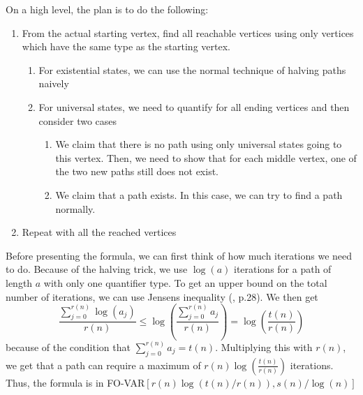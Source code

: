 On a high level, the plan is to do the following:
\begin{enumerate}
    \setlength\itemsep{0.2em}
    \item From the actual starting vertex, find all reachable vertices using only vertices which have the same type as the starting vertex.
    \begin{enumerate}
        \item For existential states, we can use the normal technique of halving paths naively
        \item For universal states, we need to quantify for all ending vertices and then consider two cases
        \begin{enumerate}
            \item We claim that there is no path using only universal states going to this vertex.
            Then, we need to show that for each middle vertex, one of the two new paths still does not exist.
            \item We claim that a path exists.
            In this case, we can try to find a path normally.
        \end{enumerate}
    \end{enumerate}
    \item Repeat with all the reached vertices
\end{enumerate}

Before presenting the formula, we can first think of how much iterations we need to do.
Because of the halving trick, we use $\log(a)$ iterations for a path of length $a$ with only one quantifier type.
To get an upper bound on the total number of iterations, we can use Jensens inequality (\cite{inequalities-math-oly}, p.28).
We then get
\[
    \frac{\sum_{j = 0}^{r(n)}\log(a_{j})}{r(n)} \leq \log\left( \frac{\sum_{j= 0}^{r(n)}a_{j}}{r(n)} \right) = \log\left( \frac{t(n)}{r(n)} \right)
\]
because of the condition that $\sum_{j= 0}^{r(n)}a_{j} = t(n)$.
Multiplying this with $r(n)$, we get that a path can require a maximum of $r(n)\log\left( \frac{t(n)}{r(n)} \right)$ iterations.
Thus, the formula is in FO-VAR$\left[ r(n)\log\left( t(n)/r(n) \right), s(n)/\log(n) \right]$

